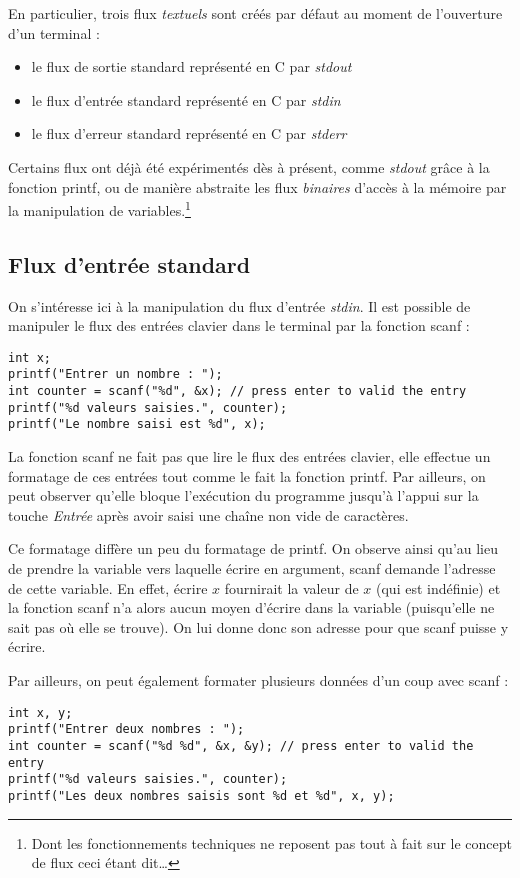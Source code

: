 \documentclass[../../../main.tex]{subfiles}
\begin{document}
En particulier, trois flux \textit{textuels} sont créés par défaut au moment de l'ouverture d'un terminal :
\begin{itemize}
	\item le flux de sortie standard représenté en C par \textit{stdout}
	\item le flux d'entrée standard représenté en C par \textit{stdin}
	\item le flux d'erreur standard représenté en C par \textit{stderr}
\end{itemize}
Certains flux ont déjà été expérimentés dès à présent, comme \textit{stdout} grâce à la fonction \textsf{printf}, ou de manière abstraite les flux \textit{binaires} d'accès à la mémoire par la manipulation de variables.\footnote{Dont les fonctionnements techniques ne reposent pas tout à fait sur le concept de flux ceci étant dit\dots }
 
\subsection{Flux d'entrée standard}
On s'intéresse ici à la manipulation du flux d'entrée \textit{stdin}. Il est possible de manipuler le flux des entrées clavier dans le terminal par la fonction \textsf{scanf} :
\begin{verbatim}
int x;
printf("Entrer un nombre : ");
int counter = scanf("%d", &x); // press enter to valid the entry
printf("%d valeurs saisies.", counter);
printf("Le nombre saisi est %d", x);
\end{verbatim}
La fonction \textsf{scanf} ne fait pas que lire le flux des entrées clavier, elle effectue un formatage de ces entrées tout comme le fait la fonction \textsf{printf}. Par ailleurs, on peut observer qu'elle bloque l'exécution du programme jusqu'à l'appui sur la touche \textit{Entrée} après avoir saisi une chaîne non vide de caractères.
 
Ce formatage diffère un peu du formatage de \textsf{printf}. On observe ainsi qu'au lieu de prendre la variable vers laquelle écrire en argument, \textsf{scanf} demande l'adresse de cette variable. En effet, écrire $x$ fournirait la valeur de $x$ (qui est indéfinie) et la fonction \textsf{scanf} n'a alors aucun moyen d'écrire dans la variable (puisqu'elle ne sait pas où elle se trouve). On lui donne donc son adresse pour que \textsf{scanf} puisse y écrire.
 
Par ailleurs, on peut également formater plusieurs données d'un coup avec \textsf{scanf} :
\begin{listing}
	\begin{verbatim}
int x, y;
printf("Entrer deux nombres : ");
int counter = scanf("%d %d", &x, &y); // press enter to valid the entry
printf("%d valeurs saisies.", counter);
printf("Les deux nombres saisis sont %d et %d", x, y);
	\end{verbatim}
	\label{lst:prgm1}
\end{listing}
\end{document}
